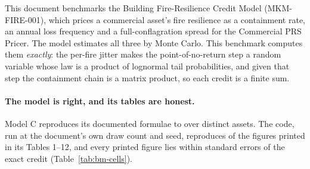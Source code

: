 \documentclass[11pt,a4paper]{article}
\begin{document}
\sloppy

\mkmtitlepage
\mkmlegalpage

\tableofcontents
\clearpage

\mkmexecsummary

This document benchmarks the Building Fire-Resilience Credit Model (MKM-FIRE-001),
which prices a commercial asset's fire resilience as a containment rate, an annual
loss frequency and a full-conflagration spread for the Commercial PRS Pricer. The
model estimates all three by Monte Carlo. This benchmark computes them
\emph{exactly}: the per-fire jitter makes the point-of-no-return step a random
variable whose law is a product of lognormal tail probabilities, and given that step
the containment chain is a matrix product, so each credit is a finite sum.

\paragraph{The model is right, and its tables are honest.} Model C reproduces its
documented formulae to \bmProfile{} over \bmAssets{} distinct assets. The code, run at
the document's own draw count and seed, reproduces \bmReproduced{} of the
\bmPrinted{} figures printed in its Tables 1--12, and every printed figure lies within
\bmWorstZ{} standard errors of the exact credit (Table~\ref{tab:bm-cells}).
\bmWolframConfirms
\end{document}
